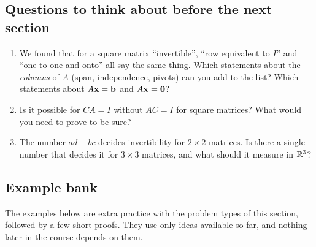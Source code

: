 \documentclass[11pt]{article}
\begin{document}
\subsection*{Questions to think about before the next section}
\begin{enumerate}
  \item We found that for a square matrix ``invertible'', ``row equivalent to $I$'' and ``one-to-one and onto'' all say the same thing. Which statements about the \emph{columns} of $A$ (span, independence, pivots) can you add to the list? Which statements about $A\mathbf{x}=\mathbf{b}$ and $A\mathbf{x}=\mathbf{0}$?
  \item Is it possible for $CA=I$ without $AC=I$ for square matrices? What would you need to prove to be sure?
  \item The number $ad-bc$ decides invertibility for $2\times2$ matrices. Is there a single number that decides it for $3\times3$ matrices, and what should it measure in $\mathbb{R}^3$?
\end{enumerate}

\subsection*{Example bank}

The examples below are extra practice with the problem types of this section, followed by a few short proofs. They use only ideas available so far, and nothing later in the course depends on them.
\end{document}
